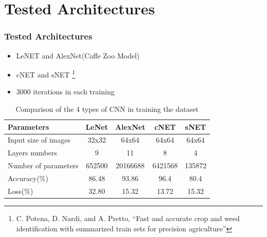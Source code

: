 \documentclass[10pt,a4paper]{beamer}
\begin{document}
\section{Tested Architectures}
\begin{frame}
\frametitle{Tested Architectures}
\begin{itemize}
	\item LeNET and AlexNet(Caffe Zoo Model) \
	\item cNET and sNET \footnote{ C. Potena, D. Nardi, and A. Pretto, “Fast and accurate crop and weed identification with summarized train sets for precision agriculture”
}
	\item 3000 iterations in each training
\end{itemize}
\begin{table}[h!]
\centering
\renewcommand{\arraystretch}{1.2}
\caption{Comparison of the 4 types of CNN in training the dataset}
\label{table:2}
\begin{tabular}{|l c c c c|} 
 \hline
 \textbf{Parameters }& \textbf{LeNet} & \textbf{AlexNet} & \textbf{cNET} & \textbf{sNET} \\ [0.75ex] 
 \hline
 Input size of images & 32x32 & 64x64 & 64x64 & 64x64 \\ 
 Layers numbers & 9 & 11 & 8 & 4\\
 Number of parameters & 652500 & 20166688 & 6421568 & 135872 \\ 
 Accuracy(\%) & 86.48 & 93.86 & 96.4 & 80.4 \\
 Loss(\%) & 32.80 & 15.32 & 13.72 & 15.32 \\ [1ex] 
 \hline 
\end{tabular}
\end{table}
\end{frame}
\end{document}
